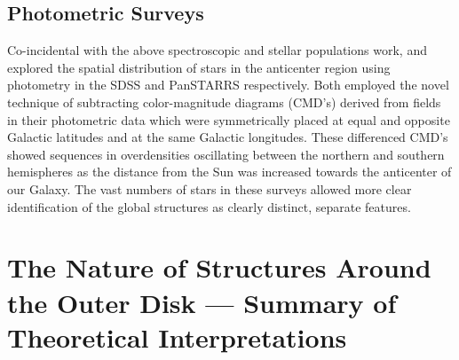 \documentclass[galaxies,article,submit,moreauthors,pdftex,10pt,a4paper]{mdpi}
\begin{document}

\subsection{Photometric Surveys}


Co-incidental with the above spectroscopic and stellar populations work, \cite{xu15} and \cite{lurie17} explored the spatial distribution of stars in the anticenter region using photometry in the SDSS and PanSTARRS \citep{kaiser10} respectively.
Both employed the novel technique of subtracting color-magnitude diagrams (CMD's) derived from fields in their photometric data which were symmetrically placed at equal and opposite Galactic latitudes and at the same Galactic longitudes.
These differenced CMD's showed sequences in overdensities oscillating between the northern and southern hemispheres as the distance from the Sun was increased towards the anticenter of our Galaxy.
The vast numbers of stars in these surveys allowed more clear identification of the global structures as clearly distinct, separate features.





\section{The Nature of Structures Around the Outer Disk --- Summary of Theoretical Interpretations}
\label{sec:theory}
\end{document}
